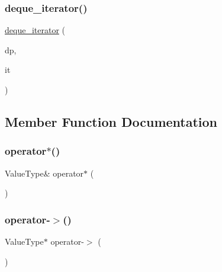 \subsubsection{\texorpdfstring{deque\+\_\+iterator()}{deque\_iterator()}\hspace{0.1cm}{\footnotesize\ttfamily [3/3]}}
{\footnotesize\ttfamily \mbox{\hyperlink{classDeque_1_1deque__iterator}{deque\+\_\+iterator}} (\begin{DoxyParamCaption}\item[{\mbox{\hyperlink{classDeque}{Deque}}$<$ Value\+Type $>$ $\ast$}]{dp,  }\item[{const typename std\+::deque$<$ Value\+Type $>$\+::iterator \&}]{it }\end{DoxyParamCaption})\hspace{0.3cm}{\ttfamily [inline]}}



\subsection{Member Function Documentation}
\mbox{\label{classDeque_1_1deque__iterator_ae7b3826e734ec2f7c79f5196fad83989}} 
\subsubsection{\texorpdfstring{operator$\ast$()}{operator*()}}
{\footnotesize\ttfamily Value\+Type\& operator$\ast$ (\begin{DoxyParamCaption}{ }\end{DoxyParamCaption})\hspace{0.3cm}{\ttfamily [inline]}}

\mbox{\label{classDeque_1_1deque__iterator_a5ba42337ec7bae549bb135838933b0ea}} 
\subsubsection{\texorpdfstring{operator-\/$>$()}{operator->()}}
{\footnotesize\ttfamily Value\+Type$\ast$ operator-\/$>$ (\begin{DoxyParamCaption}{ }\end{DoxyParamCaption})\hspace{0.3cm}{\ttfamily [inline]}}

